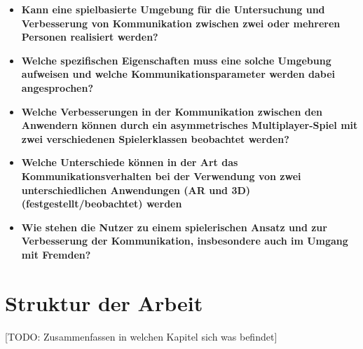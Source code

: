 \begin{itemize}
    \item \textbf{Kann eine spielbasierte Umgebung für die Untersuchung und Verbesserung von Kommunikation zwischen zwei oder mehreren Personen realisiert werden?}
    \item \textbf{Welche spezifischen Eigenschaften muss eine solche Umgebung aufweisen und welche Kommunikationsparameter werden dabei angesprochen?}
    \item \textbf{Welche Verbesserungen in der Kommunikation zwischen den Anwendern können durch ein asymmetrisches Multiplayer-Spiel mit zwei verschiedenen Spielerklassen beobachtet werden?}
    \item \textbf{Welche Unterschiede können in der Art das Kommunikationsverhalten bei der Verwendung von zwei unterschiedlichen Anwendungen (AR und 3D) (festgestellt/beobachtet) werden}
    \item \textbf{Wie stehen die Nutzer zu einem spielerischen Ansatz und zur Verbesserung der Kommunikation, insbesondere auch im Umgang mit Fremden?}
\end{itemize}

\section{Struktur der Arbeit}

[TODO: Zusammenfassen in welchen Kapitel sich was befindet]